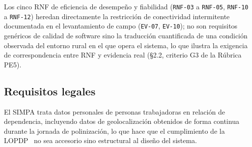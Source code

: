 \documentclass[11pt,a4paper]{article}
\newcommand{\id}[1]{\texttt{#1}}
\begin{document}
Los cinco RNF de eficiencia de desempeño y fiabilidad (\id{RNF-03} a \id{RNF-05}, \id{RNF-10} a
\id{RNF-12}) heredan directamente la restricción de conectividad intermitente documentada en el
levantamiento de campo (\id{EV-07}, \id{EV-10}); no son requisitos genéricos de calidad de software
sino la traducción cuantificada de una condición observada del entorno rural en el que opera el
sistema, lo que ilustra la exigencia de correspondencia entre RNF y evidencia real
(\S 2.2, criterio G3 de la Rúbrica PE5).

\subsection{Requisitos legales}

El SIMPA trata datos personales de personas trabajadoras en relación de dependencia, incluyendo
datos de geolocalización obtenidos de forma continua durante la jornada de polinización, lo que
hace que el cumplimiento de la LOPDP~\cite{lopdp2021} no sea accesorio sino estructural al diseño
del sistema.
\end{document}
